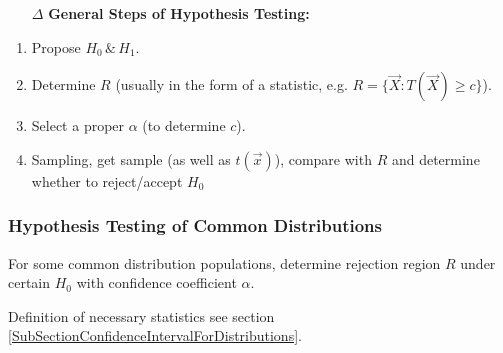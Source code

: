\documentclass[11pt,a4paper]{ctexart}
\numberwithin{equation}{section}%
\begin{document}
        \begin{itemize}
            \item [$\Delta$] \textbf{General Steps of Hypothesis Testing:}
        \end{itemize}
        

        \begin{enumerate}
            \item Propose $H_0\,\&\, H_1$.
            \item Determine $R$ (usually in the form of a statistic, e.g. $R=\{\vec{X}:T(\vec{X})\geq c\}$).
            \item Select a proper $\alpha$ (to determine $c$).
            \item Sampling, get sample (as well as $t(\vec{x})$), compare with $R$ and determine whether to reject/accept $H_0$
        \end{enumerate}

        



\subsubsection{Hypothesis Testing of Common Distributions}\label{SubSectionHypothesisTestingOfCommonDistributions}
    For some common distribution populations, determine rejection region $R$ under certain $H_0$ with confidence coefficient $\alpha$.

    Definition of necessary statistics see section \hyperref[SubSectionConfidenceIntervalForDistributions]{\ref{SubSectionConfidenceIntervalForDistributions}}.
\end{document}
